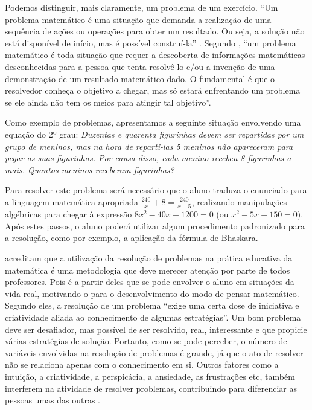 Podemos distinguir, mais claramente, um problema de um exercício. ``Um problema matemático é uma situação que demanda a 
realização de uma sequência de ações ou operações para obter um resultado. Ou seja, a solução não está disponível de início, mas é
possível construí-la'' \cite{nacionais1998terceiro}. Segundo , ``um problema matemático é toda
situação que requer a descoberta de informações matemáticas desconhecidas para a pessoa que tenta resolvê-lo e/ou a invenção de uma 
demonstração de um resultado matemático dado. O fundamental é que o resolvedor conheça o objetivo a chegar, mas só estará enfrentando um
problema se ele ainda não tem os meios para atingir tal objetivo''. 

Como exemplo de problemas, apresentamos a seguinte situação envolvendo uma equação do 2º grau: \textit{Duzentas e quarenta figurinhas devem 
ser repartidas por um grupo de meninos, mas na hora de reparti-las 5 meninos não apareceram para pegar as suas figurinhas. Por causa disso, 
cada menino recebeu 8 figurinhas a mais. Quantos meninos receberam figurinhas?}

Para resolver este problema será necessário que o aluno traduza o enunciado para a linguagem matemática apropriada $\frac{240}{x} + 8 = 
\frac{240}{x-5}$, realizando manipulações algébricas para chegar à expressão $8x^{2}-40x-1200=0$ (ou $x^{2}-5x-150=0$). Após estes 
passos, o aluno poderá utilizar algum procedimento padronizado para a resolução, como por exemplo, a aplicação da fórmula de Bhaskara.

 acreditam que a utilização da resolução de problemas na pr\'atica educativa da matemática \'e
uma metodologia que deve merecer atenção por parte de todos professores. Pois \'e a partir deles que se pode envolver o aluno em situações 
da vida real, motivando-o para o desenvolvimento do modo de pensar matemático. Segundo eles, a resolução de um problema 
``exige uma certa dose de iniciativa e criatividade aliada ao conhecimento de algumas estratégias''. Um bom problema deve ser 
desafiador, mas possível de ser resolvido, real, interessante e que propicie várias estratégias de solução. Portanto, como se pode 
perceber, o número de variáveis envolvidas na resolução de problemas é grande, já que o ato de resolver não se relaciona apenas 
com o conhecimento em si. Outros fatores como a intuição, a criatividade, a perspicácia, a ansiedade, as frustrações etc, também interferem 
na atividade de resolver problemas, contribuindo para diferenciar as pessoas umas das outras \cite{mirian2001resolucao}. 

